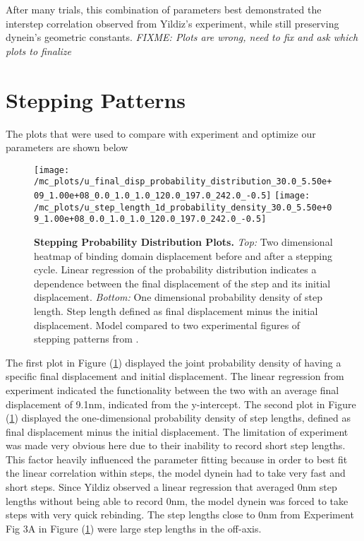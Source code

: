 After many trials, this combination of parameters best demonstrated the interstep correlation observed from Yildiz's experiment, while still preserving dynein's geometric constants. \textit{FIXME: Plots are wrong, need to fix and ask which plots to finalize}


\section{Stepping Patterns}
The plots that were used to compare with experiment and optimize our parameters are shown below
\begin{figure}[H]
	\centering
	\texttt{[image: /mc\_plots/u\_final\_disp\_probability\_distribution\_30.0\_5.50e+09\_1.00e+08\_0.0\_1.0\_1.0\_120.0\_197.0\_242.0\_-0.5]}
	\texttt{[image: /mc\_plots/u\_step\_length\_1d\_probability\_density\_30.0\_5.50e+09\_1.00e+08\_0.0\_1.0\_1.0\_120.0\_197.0\_242.0\_-0.5]}
	\caption[Final Displacement Probability Distribution]{\textbf{Stepping Probability Distribution Plots.} \textit{Top:} Two dimensional heatmap of binding domain displacement before and after a stepping cycle. Linear regression of the probability distribution indicates a dependence between the final displacement of the step and its initial displacement. \textit{Bottom:} One dimensional probability density of step length. Step length defined as final displacement minus the initial displacement. Model compared to two experimental figures of stepping patterns from \citep{Dewitt2012}.} 
	\label{fig:DataStep}
\end{figure}
The first plot in Figure (\ref{fig:DataStep}) displayed the joint probability density of having a specific final displacement and initial displacement. The linear regression from experiment indicated the functionality between the two with an average final displacement of 9.1nm, indicated from the y-intercept. The second plot in Figure (\ref{fig:DataStep}) displayed the one-dimensional probability density of step lengths, defined as final displacement minus the initial displacement. The limitation of experiment was made very obvious here due to their inability to record short step lengths. This factor heavily influenced the parameter fitting because in order to best fit the linear correlation within steps, the model dynein had to take very fast and short steps. Since Yildiz observed a linear regression that averaged 0nm step lengths without being able to record 0nm, the model dynein was forced to take steps with very quick rebinding. The step lengths close to 0nm from Experiment Fig 3A in Figure (\ref{fig:DataStep}) were large step lengths in the off-axis. 

